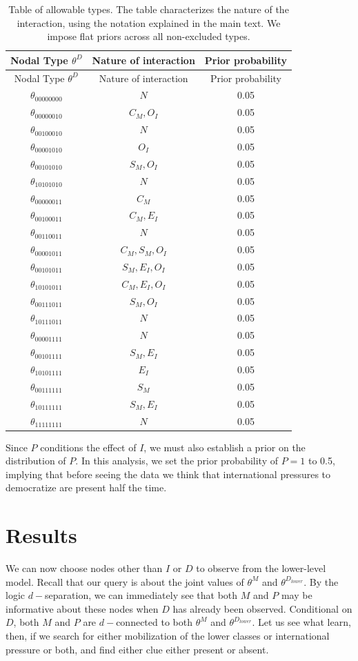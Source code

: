 \documentclass[12pt,]{book}
\begin{document}
\begin{longtable}[]{@{}ccc@{}}
\caption{\label{tab:apptypes2} Table of allowable types. The table characterizes the nature of the interaction, using the notation explained in the main text. We impose flat priors across all non-excluded types.}\tabularnewline
\toprule
Nodal Type \(\theta^D\) & Nature of interaction & Prior probability\tabularnewline
\midrule
\endfirsthead
\toprule
Nodal Type \(\theta^D\) & Nature of interaction & Prior probability\tabularnewline
\midrule
\endhead
\(\theta_{00000000}\) & \(N\) & 0.05\tabularnewline
\(\theta_{00000010}\) & \(C_M, O_I\) & 0.05\tabularnewline
\(\theta_{00100010}\) & \(N\) & 0.05\tabularnewline
\(\theta_{00001010}\) & \(O_I\) & 0.05\tabularnewline
\(\theta_{00101010}\) & \(S_M, O_I\) & 0.05\tabularnewline
\(\theta_{10101010}\) & \(N\) & 0.05\tabularnewline
\(\theta_{00000011}\) & \(C_M\) & 0.05\tabularnewline
\(\theta_{00100011}\) & \(C_M, E_I\) & 0.05\tabularnewline
\(\theta_{00110011}\) & \(N\) & 0.05\tabularnewline
\(\theta_{00001011}\) & \(C_M, S_M, O_I\) & 0.05\tabularnewline
\(\theta_{00101011}\) & \(S_M, E_I, O_I\) & 0.05\tabularnewline
\(\theta_{10101011}\) & \(C_M, E_I, O_I\) & 0.05\tabularnewline
\(\theta_{00111011}\) & \(S_M, O_I\) & 0.05\tabularnewline
\(\theta_{10111011}\) & \(N\) & 0.05\tabularnewline
\(\theta_{00001111}\) & \(N\) & 0.05\tabularnewline
\(\theta_{00101111}\) & \(S_M, E_I\) & 0.05\tabularnewline
\(\theta_{10101111}\) & \(E_I\) & 0.05\tabularnewline
\(\theta_{00111111}\) & \(S_M\) & 0.05\tabularnewline
\(\theta_{10111111}\) & \(S_M, E_I\) & 0.05\tabularnewline
\(\theta_{11111111}\) & \(N\) & 0.05\tabularnewline
\bottomrule
\end{longtable}

Since \(P\) conditions the effect of \(I\), we must also establish a prior on the distribution of \(P\). In this analysis, we set the prior probability of \(P=1\) to 0.5, implying that before seeing the data we think that international pressures to democratize are present half the time.

\hypertarget{results}{%
\section{Results}\label{results}}

We can now choose nodes other than \(I\) or \(D\) to observe from the lower-level model. Recall that our query is about the joint values of \(\theta^M\) and \(\theta^{D_{lower}}\). By the logic \(d-\)separation, we can immediately see that both \(M\) and \(P\) may be informative about these nodes when \(D\) has already been observed. Conditional on \(D\), both \(M\) and \(P\) are \(d-\)connected to both \(\theta^M\) and \(\theta^{D_{lower}}\). Let us see what learn, then, if we search for either mobilization of the lower classes or international pressure or both, and find either clue either present or absent.
\end{document}
